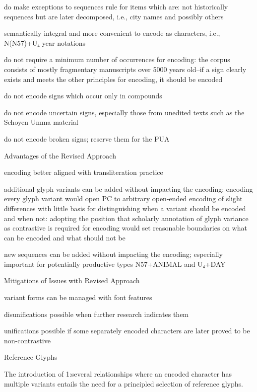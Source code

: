 \Hli{}do make exceptions to sequences rule for items which are:
	\Hul\Hli{}not historically sequences but are later decomposed, i.e., city
	  names and possibly others

\Hli{}semantically integral and more convenient to
	  encode as characters, i.e., N(N57)+U₄ year notations

\Hendul


\Hli{}do not require a minimum number of occurrences for
	encoding: the corpus consists of mostly fragmentary
	manuscripts over 5000 years old--if a sign clearly exists and
	meets the other principles for encoding, it should be
	encoded

\Hli{}do not encode signs which occur only in compounds

\Hli{}do not encode uncertain signs, especially those from
	unedited texts such as the Schoyen Umma material

\Hli{}do not encode broken signs; reserve them for the PUA

\Hendul
\Hhhh{}Advantages of the Revised Approach

\Hul\Hli{}encoding better aligned with transliteration practice

\Hli{}additional glyph variants can be added without impacting
	the encoding; encoding every glyph variant would open PC to
	arbitrary open-ended encoding of slight differences with
	little basis for distinguishing when a variant should be
	encoded and when not: adopting the position that scholarly
	annotation of glyph variance as contrastive is required for
	encoding would set reasonable boundaries on what can be
	encoded and what should not be

\Hli{}new sequences can be added without impacting the
 	encoding; especially important for potentially productive
 	types N57+ANIMAL and U₄+DAY

\Hendul
\Hhhh{}Mitigations of Issues with Revised Approach

\Hul\Hli{}variant forms can be managed with font features

\Hli{}disunifications possible when further research indicates
   	them

\Hli{}unifications possible if some separately encoded
	characters are later proved to be non-contrastive

\Hendul
\Hhhh{}Reference Glyphs


\par The introduction of 1:several relationships where an
      encoded character has multiple variants entails the need for a
      principled selection of reference glyphs.


